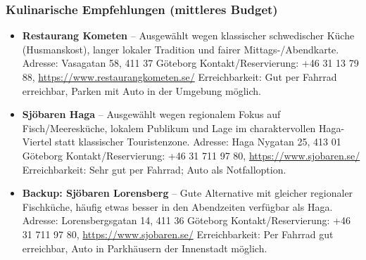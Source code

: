 \documentclass[a4paper,12pt]{article}
\begin{document}
\subsubsection{Kulinarische Empfehlungen (mittleres Budget)}
\begin{itemize}
\item \textbf{Restaurang Kometen} -- Ausgewählt wegen klassischer schwedischer Küche (Husmanskost), langer lokaler Tradition und fairer Mittags-/Abendkarte.\newline
Adresse: Vasagatan 58, 411 37 Göteborg\newline
Kontakt/Reservierung: +46 31 13 79 88, \url{https://www.restaurangkometen.se/}\newline
Erreichbarkeit: Gut per Fahrrad erreichbar, Parken mit Auto in der Umgebung möglich.

\item \textbf{Sjöbaren Haga} -- Ausgewählt wegen regionalem Fokus auf Fisch/Meeresküche, lokalem Publikum und Lage im charaktervollen Haga-Viertel statt klassischer Touristenzone.\newline
Adresse: Haga Nygatan 25, 413 01 Göteborg\newline
Kontakt/Reservierung: +46 31 711 97 80, \url{https://www.sjobaren.se/}\newline
Erreichbarkeit: Sehr gut per Fahrrad; Auto als Notfalloption.

\item \textbf{Backup: Sjöbaren Lorensberg} -- Gute Alternative mit gleicher regionaler Fischküche, häufig etwas besser in den Abendzeiten verfügbar als Haga.\newline
Adresse: Lorensbergsgatan 14, 411 36 Göteborg\newline
Kontakt/Reservierung: +46 31 711 97 80, \url{https://www.sjobaren.se/}\newline
Erreichbarkeit: Per Fahrrad gut erreichbar, Auto in Parkhäusern der Innenstadt möglich.
\end{itemize}
\end{document}
